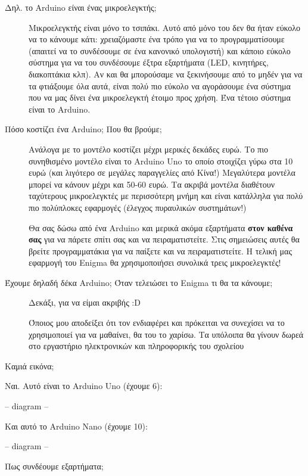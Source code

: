 \documentclass[a4paper,twoside,12pt]{article}
\begin{document}
\begin{description}
\item[Δηλ. το Arduino είναι ένας μικροελεγκτής;]

Μικροελεγκτής είναι μόνο το τσιπάκι. Αυτό από μόνο του δεν θα ήταν εύκολο να το κάνουμε κάτι: χρειαζόμαστε ένα τρόπο για να το προγραμματίσουμε (απαιτεί να το συνδέσουμε σε ένα κανονικό υπολογιστή) και κάποιο εύκολο σύστημα για να του συνδέσουμε έξτρα εξαρτήματα (LED, κινητήρες, διακοπτάκια κλπ). Αν και θα μπορούσαμε να ξεκινήσουμε από το μηδέν για να τα φτιάξουμε όλα αυτά, είναι πολύ πιο εύκολο να αγοράσουμε ένα σύστημα που να μας δίνει ένα μικροελεγκτή έτοιμο προς χρήση. Ένα τέτοιο σύστημα είναι το Arduino.

\item[Πόσο κοστίζει ένα Arduino; Που θα βρούμε;]

Ανάλογα με το μοντέλο κοστίζει μέχρι μερικές δεκάδες ευρώ. Το πιο συνηθισμένο μοντέλο είναι το Arduino Uno το οποίο στοιχίζει γύρω στα 10 ευρώ (και λιγότερο σε μεγάλες παραγγελίες από Κίνα!) Μεγαλύτερα μοντέλα μπορεί να κάνουν μέχρι και 50-60 ευρώ. Τα ακριβά μοντέλα διαθέτουν ταχύτερους μικροελεγκτές με περισσότερη μνήμη και είναι κατάλληλα για πολύ πιο πολύπλοκες εφαρμογές (έλεγχος πυραυλικών συστημάτων!)

Θα σας δώσω από ένα Arduino και μερικά ακόμα εξαρτήματα \textbf{στον καθένα σας} για να πάρετε σπίτι σας και να πειραματιστείτε. Στις σημειώσεις αυτές θα βρείτε προγραμματάκια για να παίξετε και να πειραματιστείτε. Η τελική μας εφαρμογή του Enigma θα χρησιμοποιήσει συνολικά τρεις μικροελεγκτές!

\item[Έχουμε δηλαδή δέκα Arduino; Όταν τελειώσει το Enigma τι θα τα κάνουμε;]

Δεκάξι, για να είμαι ακριβής :D
 
Όποιος μου αποδείξει ότι τον ενδιαφέρει και πρόκειται να συνεχίσει να το χρησιμοποιεί για να μαθαίνει, θα του το χαρίσω. Τα υπόλοιπα θα γίνουν δωρεά στο εργαστήριο ηλεκτρονικών και πληροφορικής του σχολείου
\end{description}

\item[Καμιά εικόνα;]

Ναι. Αυτό είναι το Arduino Uno (έχουμε 6):

-- diagram --

Και αυτό το Arduino Nano (έχουμε 10):

-- diagram --

\item[Πως συνδέουμε εξαρτήματα;]
\end{document}
